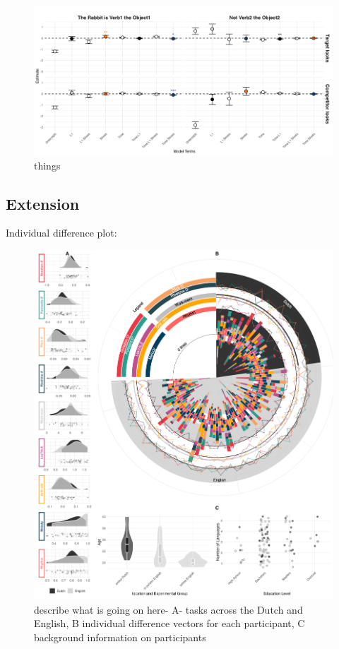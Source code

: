 \begin{figure}[H]  %
    \centering
    \includegraphics[width=\textwidth,height=\textheight,keepaspectratio]{viz/gam_mod_out.png}
    \caption{things}
    \label{fig:gam_mod_out}
\end{figure}

\subsection{Extension}

Individual difference plot:
\clearpage
\begin{figure}[p]  %
    \centering
    \includegraphics[width=\textwidth,height=\textheight,keepaspectratio]{viz/combined_plot_circle.png}
    \caption{describe what is going on here- A- tasks across the Dutch and English, B individual difference vectors for each participant, C background information on participants}
    \label{fig:combined_plot}
\end{figure}
\clearpage

